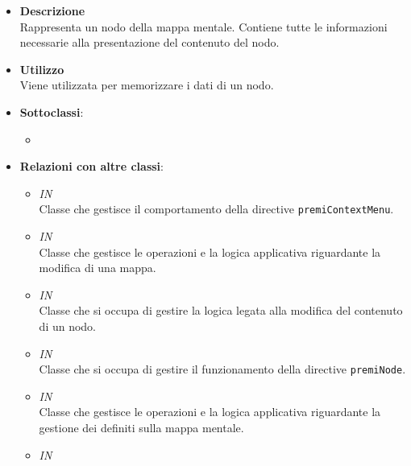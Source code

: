 \begin{itemize}
\item \textbf{Descrizione}\\
Rappresenta un nodo della mappa mentale. Contiene tutte le informazioni necessarie alla presentazione del contenuto del nodo.
\item \textbf{Utilizzo}\\
Viene utilizzata per memorizzare i dati di un nodo.
\item \textbf{Sottoclassi}:
\begin{itemize}
\item \hyperref[\nogloxy{Premi::Front-End::Model::PresentationNode}]{}
\end{itemize}
\item \textbf{Relazioni con altre classi}:
\begin{itemize}
\item \textit{IN} \hyperref[\nogloxy{Premi::Front-End::Controllers::ContextMenuController}]{}\\
Classe che gestisce il comportamento della directive \texttt{premiContextMenu}.
\item \textit{IN} \hyperref[\nogloxy{Premi::Front-End::Controllers::MindmapEditorController}]{}\\
Classe che gestisce le operazioni e la logica applicativa riguardante la modifica di una mappa.
\item \textit{IN} \hyperref[\nogloxy{Premi::Front-End::Controllers::NodeContentsEditorController}]{}\\
Classe che si occupa di gestire la logica legata alla modifica del contenuto di un nodo.
\item \textit{IN} \hyperref[\nogloxy{Premi::Front-End::Controllers::NodeController}]{}\\
Classe che si occupa di gestire il funzionamento della directive \texttt{premiNode}.
\item \textit{IN} \hyperref[\nogloxy{Premi::Front-End::Controllers::PathsEditorController}]{}\\
Classe che gestisce le operazioni e la logica applicativa riguardante la gestione dei  definiti sulla mappa mentale.
\item \textit{IN} \hyperref[\nogloxy{Premi::Front-End::Controllers::PresentationViewerController}]{}\\

\end{itemize}
\end{itemize}
